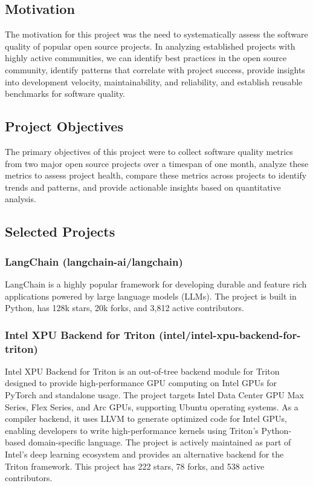 \documentclass[12pt]{article}
\begin{document}
\subsection{Motivation}
The motivation for this project was the need to systematically assess
the software quality of popular open source projects. In analyzing
established projects with highly active communities, we can identify
best practices in the open source community, identify patterns that
correlate with project success, provide insights into development
velocity, maintainability, and reliability, and establish reusable
benchmarks for software quality.

\subsection{Project Objectives}
The primary objectives of this project were to collect software quality
metrics from two major open source projects over a timespan of one
month, analyze
these metrics to assess project health, compare these metrics across projects
to identify trends and patterns, and provide actionable insights based on
quantitative analysis.

\subsection{Selected Projects}

\subsubsection{LangChain (langchain-ai/langchain)}
LangChain is a highly popular framework for developing durable and
feature rich applications powered by large
language models (LLMs). The project is built in Python, has 128k
stars, 20k forks, and 3,812 active contributors.

\subsubsection{Intel XPU Backend for Triton
(intel/intel-xpu-backend-for-triton)}
Intel XPU Backend for Triton is an out-of-tree backend module for
Triton designed to provide
high-performance GPU computing on Intel GPUs for PyTorch and
standalone usage. The project
targets Intel Data Center GPU Max Series, Flex Series, and Arc GPUs,
supporting Ubuntu
operating systems. As a compiler backend, it uses LLVM to generate
optimized code for Intel
GPUs, enabling developers to write high-performance kernels using
Triton's Python-based
domain-specific language. The project is actively maintained as part
of Intel's deep learning
ecosystem and provides an alternative backend for the Triton
framework. This project has 222 stars, 78 forks, and
538 active contributors.
\end{document}
